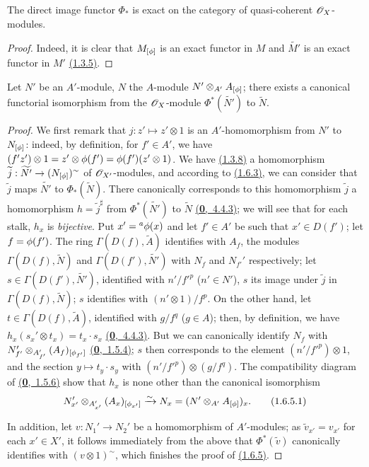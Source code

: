 \begin{cor}[1.6.4]
\label{cor-1.1.6.4}
The direct image functor $\Phi_*$ is exact on the category of quasi-coherent $\mathscr{O}_X$-modules.
\end{cor}

\begin{proof}
\label{proof-cor-1.1.6.4}
Indeed, it is clear that $M_{[\phi]}$ is an exact functor in $M$ and $\widetilde{M'}$ is an
exact functor in $M'$ \hyperref[prop-1.1.3.5]{(1.3.5)}.
\end{proof}

\begin{prop}[1.6.5]
\label{prop-1.1.6.5}
Let $N'$ be an $A'$-module, $N$ the $A$-module $N'\otimes_{A'}A_{[\phi]}$; there exists a
canonical functorial isomorphism from the $\mathscr{O}_X$-module $\Phi^*(\widetilde{N'})$ to
$\widetilde{N}$.
\end{prop}

\begin{proof}
\label{proof-prop-1.1.6.5}
We first remark that $j:z'\mapsto z'\otimes 1$ is an $A'$-homomorphism from $N'$ to
$N_{[\phi]}$: indeed, by definition, for $f'\in A'$, we have
$(f' z')\otimes 1=z'\otimes\phi(f')=\phi(f')(z'\otimes 1)$. We have \hyperref[cor-1.1.3.8]{(1.3.8)} a
homomorphism $\widetilde{j}:\widetilde{N'}\to(N_{[\phi]})^\sim$ of $\mathscr{O}_{X'}$-modules, and
according to \hyperref[prop-1.1.6.3]{(1.6.3)}, we can consider that $\widetilde{j}$ maps $\widetilde{N'}$
to $\Phi_*(\widetilde{N})$. There canonically corresponds to this homomorphism
$\widetilde{j}$ a homomorphism $h=\widetilde{j}^\sharp$ from $\Phi^*(\widetilde{N'})$ to
$\widetilde{N}$ \hyperref[env-0.4.4.3]{(\textbf{0},~4.4.3)}; we will see that for each stalk, $h_x$ is {\it bijective}.
Put $x'={}^a\phi(x)$ and let $f'\in A'$ be such that $x'\in D(f')$; let $f=\phi(f')$. The
ring $\Gamma(D(f),\widetilde{A})$ identifies with $A_f$, the modules
$\Gamma(D(f),\widetilde{N})$ and $\Gamma(D(f'),\widetilde{N'})$ with $N_f$ and $N_{f'}'$
respectively; let $s\in\Gamma(D(f'),\widetilde{N'})$, identified with $n'/{f'}^p$
($n'\in N'$), $s$ its image under $\widetilde{j}$ in $\Gamma(D(f),\widetilde{N})$; $s$
identifies with $(n'\otimes 1)/f^p$. On the other hand, let $t\in\Gamma(D(f),\widetilde{A})$,
identified with $g/f^q$ ($g\in A$); then, by definition, we have
$h_x(s_x'\otimes t_x)=t_x\cdot s_x$ \hyperref[env-0.4.4.3]{(\textbf{0},~4.4.3)}. But we can canonically identify $N_f$
with $N_{f'}'\otimes_{A_{f'}'}(A_f)_{[\phi_{f'}]}$ \hyperref[env-0.1.5.4]{(\textbf{0},~1.5.4)}; $s$ then corresponds
to the element $(n'/{f'}^p)\otimes 1$, and the section $y\mapsto t_y\cdot s_y$ with
$(n'/{f'}^p)\otimes(g/f^q)$. The compatibility diagram of \hyperref[env-0.1.5.6]{(\textbf{0},~1.5.6)} show that $h_x$
is none other than the canonical isomorphism
\[
  N_{x'}'\otimes_{A_{x'}'}(A_x)_{[\phi_{x'}]}\xrightarrow{\sim} N_x=(N'\otimes_{A'}A_{[\phi]})_x.
  \tag{1.6.5.1}
\]

In addition, let $v:N_1'\to N_2'$ be a homomorphism of $A'$-modules; as
$\widetilde{v}_{x'}=v_{x'}$ for each $x'\in X'$, it follows immediately from the above that
$\Phi^*(\widetilde{v})$ canonically identifies with $(v\otimes 1)^\sim$, which finishes the
proof of \hyperref[prop-1.1.6.5]{(1.6.5)}.
\end{proof}

